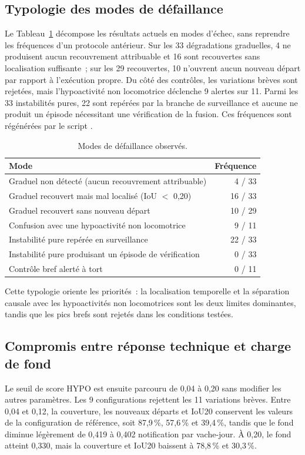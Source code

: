 \subsection{Typologie des modes de défaillance}
Le Tableau~\ref{tab:failure_modes} décompose les résultats actuels en modes d'échec, sans
reprendre les fréquences d'un protocole antérieur. Sur les 33 dégradations graduelles, 4
ne produisent aucun recouvrement attribuable et 16 sont recouvertes sans localisation
suffisante~; sur les 29 recouvertes, 10 n'ouvrent aucun nouveau départ par rapport à
l'exécution propre. Du côté des contrôles, les variations brèves sont rejetées, mais
l'hypoactivité non locomotrice déclenche 9 alertes sur 11. Parmi les 33 instabilités
pures, 22 sont repérées par la branche de surveillance et aucune ne produit un épisode
nécessitant une vérification de la fusion. Ces fréquences sont régénérées par le script
.

\begin{table}[H]
  \centering
  \caption{Modes de défaillance observés.}
  \label{tab:failure_modes}
  \small
  \begin{tabular}{p{}r}
    \toprule
    Mode & Fréquence \\
    \midrule
    Graduel non détecté (aucun recouvrement attribuable) & 4 / 33 \\
    Graduel recouvert mais mal localisé (IoU $<$ 0,20) & 16 / 33 \\
    Graduel recouvert sans nouveau départ & 10 / 29 \\
    Confusion avec une hypoactivité non locomotrice & 9 / 11 \\
    Instabilité pure repérée en surveillance & 22 / 33 \\
    Instabilité pure produisant un épisode de vérification & 0 / 33 \\
    Contrôle bref alerté à tort & 0 / 11 \\
    \bottomrule
  \end{tabular}
\end{table}

Cette typologie oriente les priorités~: la localisation temporelle et la séparation causale
avec les hypoactivités non locomotrices sont les deux limites dominantes, tandis que les pics
brefs sont rejetés dans les conditions testées.

\subsection{Compromis entre réponse technique et charge de fond}
Le seuil de score HYPO est ensuite parcouru de 0,04 à 0,20 sans modifier les autres paramètres.
Les 9 configurations rejettent les 11 variations brèves. Entre 0,04 et 0,12, la
couverture, les nouveaux départs et IoU20 conservent les valeurs de la configuration de
référence, soit 87,9\,\%, 57,6\,\% et
39,4\,\%, tandis que le fond diminue légèrement de 0,419 à 0,402 notification par
vache-jour. À 0,20, le fond atteint 0,330, mais la couverture et IoU20 baissent à 78,8\,\%
et 30,3\,\%.


